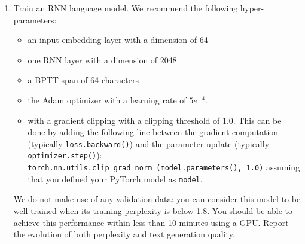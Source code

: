 \documentclass[a4paper,11pt]{article}
\begin{document}
\begin{enumerate}
\item Train an RNN language model. We recommend the following hyper-parameters:
\begin{itemize}
\item an input embedding layer with a dimension of 64
\item one RNN layer with a dimension of 2048
\item a BPTT span of 64 characters
\item the Adam optimizer with a learning rate of $5e^{-4}$.
\item with a gradient clipping with a clipping threshold of $1.0$.
This can be done by adding the following line between the gradient computation (typically \texttt{loss.backward()})
and the parameter update (typically \texttt{optimizer.step()}):\\
\texttt{torch.nn.utils.clip\_grad\_norm\_(model.parameters(), 1.0)} assuming that you defined your PyTorch model as \texttt{model}.
\end{itemize}
We do not make use of any validation data: you can consider this model to be well trained when its training perplexity is below 1.8.
You should be able to achieve this performance within less than 10 minutes using a GPU.
Report the evolution of both perplexity and text generation quality.


\end{enumerate}
\end{document}
